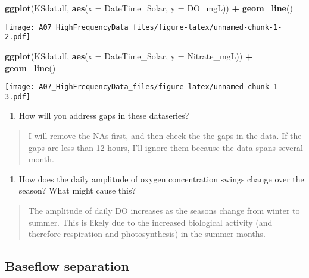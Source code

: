 \documentclass[]{article}
\newenvironment{Shaded}{\begin{snugshade}}{\end{snugshade}}
\newcommand{\DataTypeTok}[1]{\textcolor[rgb]{0.13,0.29,0.53}{#1}}
\newcommand{\KeywordTok}[1]{\textcolor[rgb]{0.13,0.29,0.53}{\textbf{#1}}}
\newcommand{\NormalTok}[1]{#1}
\newcommand{\OperatorTok}[1]{\textcolor[rgb]{0.81,0.36,0.00}{\textbf{#1}}}
\newcommand{\StringTok}[1]{\textcolor[rgb]{0.31,0.60,0.02}{#1}}
\providecommand{\tightlist}{%
  \setlength{\itemsep}{0pt}\setlength{\parskip}{0pt}}
\begin{document}
\begin{Shaded}
\begin{Highlighting}[]
\KeywordTok{ggplot}\NormalTok{(KSdat.df, }\KeywordTok{aes}\NormalTok{(}\DataTypeTok{x =}\NormalTok{ DateTime_Solar, }\DataTypeTok{y =}\NormalTok{ DO_mgL)) }\OperatorTok{+}\StringTok{ }\KeywordTok{geom_line}\NormalTok{()}
\end{Highlighting}
\end{Shaded}

\texttt{[image: A07\_HighFrequencyData\_files/figure-latex/unnamed-chunk-1-2.pdf]}

\begin{Shaded}
\begin{Highlighting}[]
\KeywordTok{ggplot}\NormalTok{(KSdat.df, }\KeywordTok{aes}\NormalTok{(}\DataTypeTok{x =}\NormalTok{ DateTime_Solar, }\DataTypeTok{y =}\NormalTok{ Nitrate_mgL)) }\OperatorTok{+}\StringTok{ }\KeywordTok{geom_line}\NormalTok{()}
\end{Highlighting}
\end{Shaded}

\texttt{[image: A07\_HighFrequencyData\_files/figure-latex/unnamed-chunk-1-3.pdf]}

\begin{enumerate}
\def\labelenumi{\arabic{enumi}.}
\setcounter{enumi}{6}
\tightlist
\item
  How will you address gaps in these dataseries?
\end{enumerate}

\begin{quote}
I will remove the NAs first, and then check the the gaps in the data. If
the gaps are less than 12 hours, I'll ignore them because the data spans
several month.
\end{quote}

\begin{enumerate}
\def\labelenumi{\arabic{enumi}.}
\setcounter{enumi}{7}
\tightlist
\item
  How does the daily amplitude of oxygen concentration swings change
  over the season? What might cause this?
\end{enumerate}

\begin{quote}
The amplitude of daily DO increases as the seasons change from winter to
summer. This is likely due to the increased biological activity (and
therefore respiration and photosynthesis) in the summer months.
\end{quote}

\hypertarget{baseflow-separation}{%
\subsection{Baseflow separation}\label{baseflow-separation}}
\end{document}
